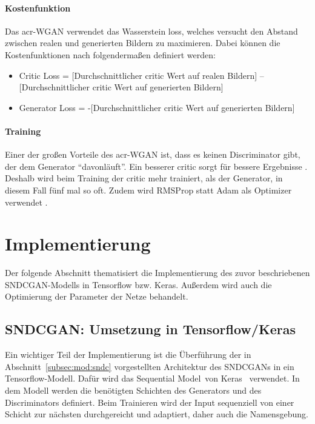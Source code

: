  \paragraph{Kostenfunktion} Das \gls{acr-WGAN} verwendet das Wasserstein loss,
 welches versucht den Abstand zwischen realen und generierten Bildern zu
 maximieren. Dabei können die Kostenfunktionen nach \cite{brownlee_how_2019}
 folgendermaßen definiert werden:
 \begin{itemize}
 	\item Critic Loss = [Durchschnittlicher critic Wert auf realen Bildern] –
 	[Durchschnittlicher critic Wert auf generierten Bildern]
 	\item Generator Loss = -[Durchschnittlicher critic Wert auf generierten
 	Bildern]
 \end{itemize}

\paragraph{Training} Einer der großen Vorteile des \gls{acr-WGAN} ist, dass es
keinen Discriminator gibt, der dem Generator \enquote{davonläuft}. Ein besserer
critic sorgt für bessere Ergebnisse \cite[S. 8]{arjovsky_wasserstein_2017}.
Deshalb wird beim Training der critic mehr trainiert, als der Generator, in
diesem Fall fünf mal so oft. Zudem wird RMSProp statt Adam als Optimizer
verwendet \cite[S. 12]{arjovsky2017wasserstein}.
 
  \section{Implementierung} %
  \label{sec:gen_impl}
 
 Der folgende Abschnitt thematisiert die Implementierung des zuvor beschriebenen
 SNDCGAN-Modells in Tensorflow bzw. Keras. Außerdem wird auch die Optimierung
 der Parameter der Netze behandelt.
 
 \subsection{SNDCGAN: Umsetzung in Tensorflow/Keras}\label{subsec:imp:sndc}
 
 Ein wichtiger Teil der Implementierung ist die Überführung der in
 Abschnitt~\ref{subsec:mod:sndc} vorgestellten Architektur des SNDCGANs in ein
 Tensorflow-Modell. Dafür wird das \glqq Sequential Model\grqq\ von
 Keras~\cite{keras:SequentialModel} verwendet. In dem Modell werden die
 benötigten Schichten des Generators und des Discriminators definiert. Beim
 Trainieren wird der Input sequenziell von einer Schicht zur nächsten
 durchgereicht und adaptiert, daher auch die Namensgebung.  
 
